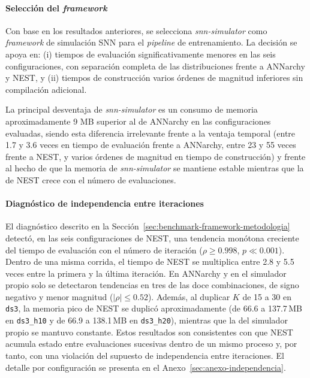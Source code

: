 
\paragraph{Selección del \textit{framework}}

Con base en los resultados anteriores, se selecciona \textit{snn-simulator} como \textit{framework} de simulación SNN para el \textit{pipeline} de entrenamiento. La decisión se apoya en: (i) tiempos de evaluación significativamente menores en las seis configuraciones, con separación completa de las distribuciones frente a ANNarchy y NEST, y (ii) tiempos de construcción varios órdenes de magnitud inferiores sin compilación adicional.

La principal desventaja de \textit{snn-simulator} es un consumo de memoria aproximadamente 9 MB superior al de ANNarchy en las configuraciones evaluadas, siendo esta diferencia irrelevante frente a la ventaja temporal (entre 1.7 y 3.6 veces en tiempo de evaluación frente a ANNarchy, entre 23 y 55 veces frente a NEST, y varios órdenes de magnitud en tiempo de construcción) y frente al hecho de que la memoria de \textit{snn-simulator} se mantiene estable mientras que la de NEST crece con el número de evaluaciones.

\paragraph{Diagnóstico de independencia entre iteraciones}

El diagnóstico descrito en la Sección~\ref{sec:benchmark-framework-metodologia} detectó, en las seis configuraciones de NEST, una tendencia monótona creciente del tiempo de evaluación con el número de iteración ($\rho \geq 0.998$, $p \ll 0.001$). Dentro de una misma corrida, el tiempo de NEST se multiplica entre 2.8 y 5.5 veces entre la primera y la última iteración. En ANNarchy y en el simulador propio solo se detectaron tendencias en tres de las doce combinaciones, de signo negativo y menor magnitud ($|\rho| \leq 0.52$). Además, al duplicar $K$ de 15 a 30 en \texttt{ds3}, la memoria pico de NEST se duplicó aproximadamente (de 66.6 a 137.7\,MB en \texttt{ds3\_h10} y de 66.9 a 138.1\,MB en \texttt{ds3\_h20}), mientras que la del simulador propio se mantuvo constante. Estos resultados son consistentes con que NEST acumula estado entre evaluaciones sucesivas dentro de un mismo proceso y, por tanto, con una violación del supuesto de independencia entre iteraciones. El detalle por configuración se presenta en el Anexo~\ref{sec:anexo-independencia}.

